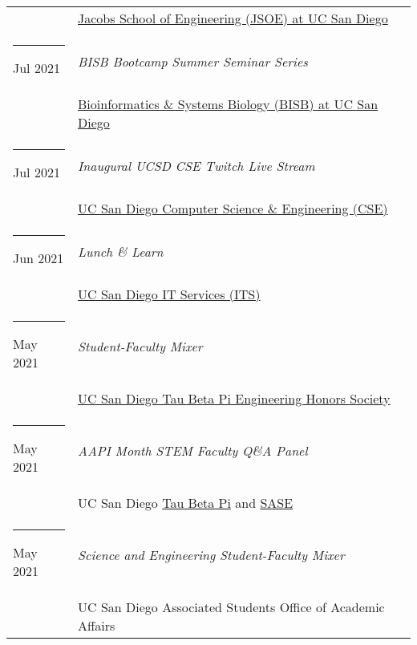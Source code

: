 \documentclass[margin,line]{res}
\begin{document}
\begin{resume}
\begin{longtable}{@{}p{0.7in}p{4in}}
\hspace*{-4mm} & \hspace{4mm} \href{https://jacobsschool.ucsd.edu/}{Jacobs School of Engineering (JSOE) at UC San Diego}\\
\hspace*{-4mm} \rule{-1mm}{5mm} Jul 2021 & \textit{BISB Bootcamp Summer Seminar Series}\\*
\hspace*{-4mm} & \hspace{4mm} \href{https://bioinformatics.ucsd.edu/}{Bioinformatics \& Systems Biology (BISB) at UC San Diego}\\
\hspace*{-4mm} \rule{-1mm}{5mm} Jul 2021 & \textit{Inaugural UCSD CSE Twitch Live Stream}\\*
\hspace*{-4mm} & \hspace{4mm} \href{https://cse.ucsd.edu/}{UC San Diego Computer Science \& Engineering (CSE)}\\
\hspace*{-4mm} \rule{-1mm}{5mm} Jun 2021 & \textit{Lunch \& Learn}\\*
\hspace*{-4mm} & \hspace{4mm} \href{https://its.ucsd.edu}{UC San Diego IT Services (ITS)}\\
\hspace*{-4mm} \rule{-1mm}{5mm} May 2021 & \textit{Student-Faculty Mixer}\\*
\hspace*{-4mm} & \hspace{4mm} \href{https://tbp.ucsd.edu/home}{UC San Diego Tau Beta Pi Engineering Honors Society}\\
\hspace*{-4mm} \rule{-1mm}{5mm} May 2021 & \textit{AAPI Month STEM Faculty Q\&A Panel}\\*
\hspace*{-4mm} & \hspace{4mm} UC San Diego \href{https://tbp.ucsd.edu/home}{Tau Beta Pi} and \href{https://saseatucsd.weebly.com/}{SASE}\\
\hspace*{-4mm} \rule{-1mm}{5mm} May 2021 & \textit{Science and Engineering Student-Faculty Mixer}\\*
\hspace*{-4mm} & \hspace{4mm} UC San Diego Associated Students Office of Academic Affairs\\

\end{longtable}
\end{resume}
\end{document}
